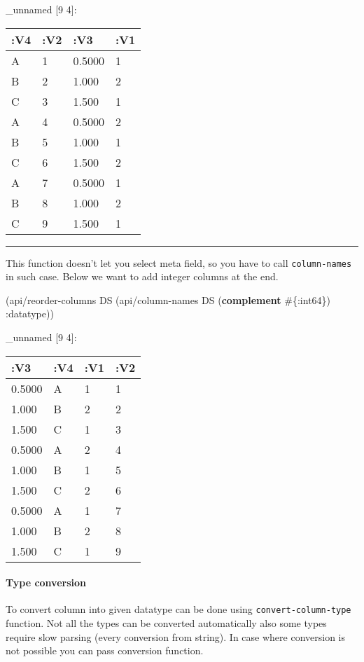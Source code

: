 \documentclass[]{article}
\newenvironment{Shaded}{\begin{snugshade}}{\end{snugshade}}
\newcommand{\KeywordTok}[1]{\textcolor[rgb]{0.13,0.29,0.53}{\textbf{#1}}}
\newcommand{\AttributeTok}[1]{\textcolor[rgb]{0.77,0.63,0.00}{#1}}
\newcommand{\NormalTok}[1]{#1}
\let\oldparagraph\paragraph
\renewcommand{\paragraph}[1]{\oldparagraph{#1}\mbox{}}
\begin{document}
\_unnamed {[}9 4{]}:

\begin{longtable}[]{@{}llll@{}}
\toprule
:V4 & :V2 & :V3 & :V1\tabularnewline
\midrule
\endhead
A & 1 & 0.5000 & 1\tabularnewline
B & 2 & 1.000 & 2\tabularnewline
C & 3 & 1.500 & 1\tabularnewline
A & 4 & 0.5000 & 2\tabularnewline
B & 5 & 1.000 & 1\tabularnewline
C & 6 & 1.500 & 2\tabularnewline
A & 7 & 0.5000 & 1\tabularnewline
B & 8 & 1.000 & 2\tabularnewline
C & 9 & 1.500 & 1\tabularnewline
\bottomrule
\end{longtable}

\begin{center}\rule{0.5\linewidth}{0.5pt}\end{center}

This function doesn't let you select meta field, so you have to call
\texttt{column-names} in such case. Below we want to add integer columns
at the end.

\begin{Shaded}
\begin{Highlighting}[]
\NormalTok{(api/reorder-columns DS (api/column-names DS (}\KeywordTok{complement}\NormalTok{ #\{}\AttributeTok{:int64}\NormalTok{\}) }\AttributeTok{:datatype}\NormalTok{))}
\end{Highlighting}
\end{Shaded}

\_unnamed {[}9 4{]}:

\begin{longtable}[]{@{}llll@{}}
\toprule
:V3 & :V4 & :V1 & :V2\tabularnewline
\midrule
\endhead
0.5000 & A & 1 & 1\tabularnewline
1.000 & B & 2 & 2\tabularnewline
1.500 & C & 1 & 3\tabularnewline
0.5000 & A & 2 & 4\tabularnewline
1.000 & B & 1 & 5\tabularnewline
1.500 & C & 2 & 6\tabularnewline
0.5000 & A & 1 & 7\tabularnewline
1.000 & B & 2 & 8\tabularnewline
1.500 & C & 1 & 9\tabularnewline
\bottomrule
\end{longtable}

\paragraph{Type conversion}\label{type-conversion}

To convert column into given datatype can be done using
\texttt{convert-column-type} function. Not all the types can be
converted automatically also some types require slow parsing (every
conversion from string). In case where conversion is not possible you
can pass conversion function.
\end{document}
